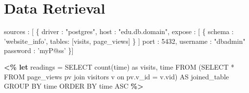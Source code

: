 \section{Data Retrieval}
\label{section:dataretrieval}

\begin{figure*}
\centering
%
%
\begin{minipage}[c]{6cm}
\begin{minipage}[c]{6cm}
\begin{code}
   sources : [ \{ 
     driver   : "postgres", 
     host     : "edu.db.domain", 
     expose   : [ \{
      schema : 'website_info', 
      tables: [visits, page_views] \} ]
     port     : 5432, 
     username : "dbadmin" 
     password : 'myP@ss'
   \}] 
\end{code}
\label{figure:source-config-file}
\end{minipage}
%
\begin{minipage}[c]{6cm}
\begin{code}
\textbf{<\% let} readings = 
   SELECT count(time) as visits, time
   FROM (SELECT * FROM page_views pv 
  	     join visitors v 
         on pv.v_id = v.vid) AS joined_table
   GROUP BY time 
   ORDER BY time ASC \textbf{\%>}
\end{code}
\vspace*{-0.3cm}
\label{figure:running-example:data-retrieval}
\vspace*{0.3cm}
\end{minipage}


\end{minipage}
\end{figure*}
